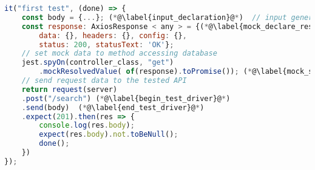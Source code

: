 \begin{lstlisting}[float,language=JavaScript,caption=Ví dụ áp dụng \gls{mocking} đối với mã nguồn dự án sử dụng framework NestJS, label=mock_example,captionpos=b]
it("first test", (done) => {
    const body = {...}; (*@\label{input_declaration}@*)  // input generated by the two methods
    const response: AxiosResponse < any > = {(*@\label{mock_declare_response}@*)// initialize mock data
        data: {}, headers: {}, config: {},
        status: 200, statusText: 'OK'};
    // set mock data to method accessing database
    jest.spyOn(controller_class, "get")
        .mockResolvedValue( of(response).toPromise()); (*@\label{mock_spy}@*)
    // send request data to the tested API
    return request(server)
    .post("/search") (*@\label{begin_test_driver}@*)
    .send(body)  (*@\label{end_test_driver}@*)
    .expect(201).then(res => {
        console.log(res.body);
        expect(res.body).not.toBeNull();
        done();
    })
});
\end{lstlisting}